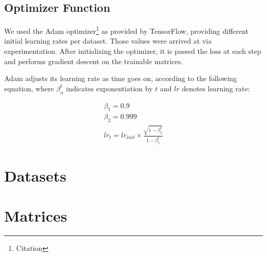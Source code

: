 \subsection{Optimizer Function}
\label{subsec:optimizer}
We used the Adam optimizer\footnote{Citation} as provided by TensorFlow, 
providing different initial learning rates per dataset. Those values were 
arrived at via experimentation. After initializing the optimizer, it is passed 
the loss at each step and performs gradient descent on the trainable matrices.

Adam adjusts its learning rate as time goes on, according to the following 
equation, where $\beta_n^t$ indicates exponentiation by $t$ and $lr$ denotes 
learning rate:
\begin{figure}[h]
	\begin{minipage}[b]{.38\textwidth}
		\centering
		\begin{gather}
			\nonumber
			\beta_1 = 0.9\\
			\nonumber
			\beta_2 = 0.999\\
			\nonumber
			lr_t = lr_{init} \times \frac{\sqrt{1-\beta_2^t}}{1-\beta_1^t}
		\end{gather}
	\end{minipage}
	\hfill
	\begin{minipage}{.6\textwidth}
		\centering
	\end{minipage}
\end{figure}

\section{Datasets}


\section{Matrices}
